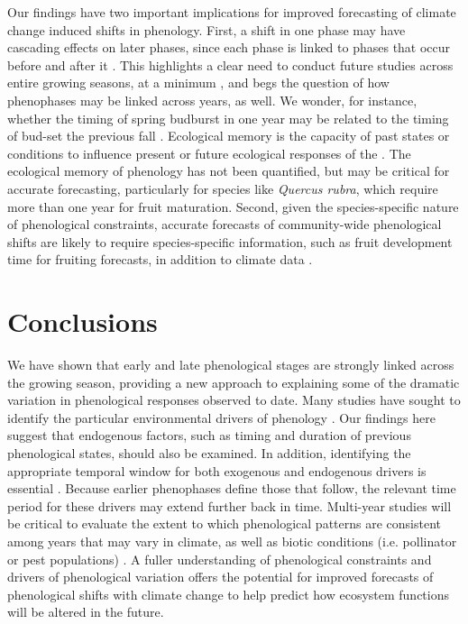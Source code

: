\documentclass{article}
\begin{document}
\par Our findings have two important implications for improved forecasting of climate change induced shifts in phenology. First, a shift in one phase may have cascading effects on later phases, since each phase is linked to phases that occur before and after it \citep{wolkovich2014b}. This highlights a clear need to conduct future studies across entire growing seasons, at a minimum \citep{wolkovich2014}, and begs the question of how phenophases may be linked across years, as well. We wonder, for instance, whether the timing of spring budburst in one year may be related to the timing of bud-set the previous fall \citep {mimura2010}. Ecological memory is the capacity of past states or conditions to influence present or future ecological responses of the  \citep {ogle2015}. The ecological memory of phenology has not been quantified, but may be critical for accurate forecasting, particularly for species like \emph{Quercus rubra}, which require more than one year for fruit maturation. Second, given the species-specific nature of phenological constraints, accurate forecasts of community-wide phenological shifts are likely to require species-specific information, such as fruit development time for fruiting forecasts, in addition to climate data \citep{diez2012}. %


\section* {Conclusions}
We have shown that early and late phenological stages are strongly linked across the growing season, providing a new approach to explaining some of the dramatic variation in phenological responses observed to date.  Many studies have sought to identify the particular environmental drivers of phenology \citep [e.g.][]{morin2010,schwartz2013}. Our findings here suggest that endogenous factors, such as timing and duration of previous phenological states, should also be examined. In addition, identifying the appropriate temporal window for both exogenous and endogenous drivers is essential \citep{teller2016}. Because earlier phenophases define those that follow, the relevant time period for these drivers may extend further back in time. Multi-year studies will be critical to evaluate the extent to which phenological patterns are consistent among years that may vary in climate, as well as biotic conditions (i.e. pollinator or pest populations)  \citep{lechowicz1995}. %
A fuller understanding of phenological constraints and drivers of phenological variation offers the potential for improved forecasts of phenological shifts  with climate change to help predict how ecosystem functions will be altered in the future. 
\end{document}
